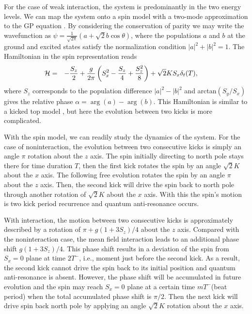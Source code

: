 \documentclass[twocolumn,prl,aps,showpacs]{revtex4}
\begin{document}
For the case of  weak interaction, the system is 
predominantly in the 
two energy levels. We can
map the system onto a spin model
with a two-mode approximation to the GP equation \cite{liu}.
By considering the conservation of parity we may write the wavefunction as 
$%
\psi =\frac 1{\sqrt{2\pi }}\left( a+\sqrt{2}b\cos \theta \right) $, where
the populations $a$ and $b$ at the ground and excited states satisfy the
normalization condition $\left| a\right| ^2+\left| b\right| ^2=1.$ The Hamiltonian in the spin representation  reads
\begin{eqnarray}
\hspace*{-0.5cm}
\mathcal{H} &=&-\frac {S_z}2+\frac g{2\pi}\left( S_x^2-\frac {S_z}4+\frac
{S_z^2}8\right) +\sqrt{2}KS_x\delta_t(T), \label{2}
\end{eqnarray}
where $S_z$ corresponds to the  population difference $\left| a\right| 
^2-\left| b\right| ^2$ 
and
arctan$(S_y/S_x)$ gives 
the  relative phase $\alpha =\arg (a)-\arg (b)$.
This
Hamiltonian is similar to a kicked top model \cite{kicktop},
but here the 
evolution between two kicks is more complicated.

With the spin model, we can readily study the dynamics of the system. 
For the case of noninteraction, the 
evolution between two consecutive kicks is
simply an angle $\pi$ rotation about the $z$
axis. 
The spin initially directing to north pole stays there 
for time duration $T$, then
the  first kick rotates  the spin 
by an angle $\sqrt{2}K$ about the $x$ axis. The 
following free evolution rotates the spin by an angle $\pi$ about
the $z$ axis.
Then, the second kick will drive the spin back to north pole through 
another rotation of $\sqrt{2}K$ about the $x$ axis.
With this the spin's motion is two kick period
recurrence and quantum anti-resonance occurs.

With interaction, the 
motion between 
two consecutive kicks is
approximately described by a rotation of $\pi+g(1+3S_z)/4$
about the $z$ axis. Compared with the noninteraction case, the mean field interaction leads to an additional
phase shift $g(1+3S_z)/4$. This phase shift results in a 
deviation of the spin from $S_x=0$ plane at time $2T^-$, i.e., moment just 
before the second kick. As a result, the second kick cannot drive the 
spin back to its initial position and quantum anti-resonance is absent. However, the phase 
shift will be accumulated in future evolution and 
the spin may reach $S_x=0$ plane
at a certain
time $mT^-$(beat period) when the total accumulated phase shift is $\pi/2$. 
Then the next kick will 
drive  spin back north pole by applying an
angle $\sqrt{2}K$ rotation about the $x$ axis.
\end{document}
